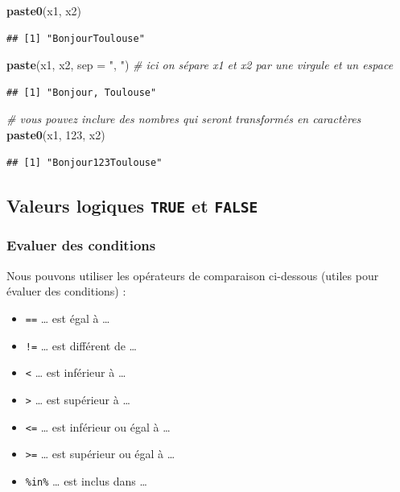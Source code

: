 \documentclass[
]{book}
\newenvironment{Shaded}{\begin{snugshade}}{\end{snugshade}}
\newcommand{\AttributeTok}[1]{\textcolor[rgb]{0.13,0.29,0.53}{#1}}
\newcommand{\CommentTok}[1]{\textcolor[rgb]{0.56,0.35,0.01}{\textit{#1}}}
\newcommand{\DecValTok}[1]{\textcolor[rgb]{0.00,0.00,0.81}{#1}}
\newcommand{\FunctionTok}[1]{\textcolor[rgb]{0.13,0.29,0.53}{\textbf{#1}}}
\newcommand{\NormalTok}[1]{#1}
\newcommand{\StringTok}[1]{\textcolor[rgb]{0.31,0.60,0.02}{#1}}
\providecommand{\tightlist}{%
  \setlength{\itemsep}{0pt}\setlength{\parskip}{0pt}}
\begin{document}
\begin{Shaded}
\begin{Highlighting}[]
\FunctionTok{paste0}\NormalTok{(x1, x2)}
\end{Highlighting}
\end{Shaded}

\begin{verbatim}
## [1] "BonjourToulouse"
\end{verbatim}

\begin{Shaded}
\begin{Highlighting}[]
\FunctionTok{paste}\NormalTok{(x1, x2, }\AttributeTok{sep =} \StringTok{", "}\NormalTok{) }\CommentTok{\# ici on sépare x1 et x2 par une virgule et un espace}
\end{Highlighting}
\end{Shaded}

\begin{verbatim}
## [1] "Bonjour, Toulouse"
\end{verbatim}

\begin{Shaded}
\begin{Highlighting}[]
\CommentTok{\# vous pouvez inclure des nombres qui seront transformés en caractères}
\FunctionTok{paste0}\NormalTok{(x1, }\DecValTok{123}\NormalTok{, x2)}
\end{Highlighting}
\end{Shaded}

\begin{verbatim}
## [1] "Bonjour123Toulouse"
\end{verbatim}

\subsection{\texorpdfstring{Valeurs logiques \texttt{TRUE} et \texttt{FALSE}}{Valeurs logiques TRUE et FALSE}}\label{valeurs-logiques-true-et-false}

\subsubsection{Evaluer des conditions}\label{evaluer-des-conditions}

Nous pouvons utiliser les opérateurs de comparaison ci-dessous (utiles pour évaluer des conditions) :

\begin{itemize}
\tightlist
\item
  \texttt{==} \ldots{} est égal à \ldots{}
\item
  \texttt{!=} \ldots{} est différent de \ldots{}
\item
  \texttt{\textless{}} \ldots{} est inférieur à \ldots{}
\item
  \texttt{\textgreater{}} \ldots{} est supérieur à \ldots{}
\item
  \texttt{\textless{}=} \ldots{} est inférieur ou égal à \ldots{}
\item
  \texttt{\textgreater{}=} \ldots{} est supérieur ou égal à \ldots{}
\item
  \texttt{\%in\%} \ldots{} est inclus dans \ldots{}
\end{itemize}
\end{document}
